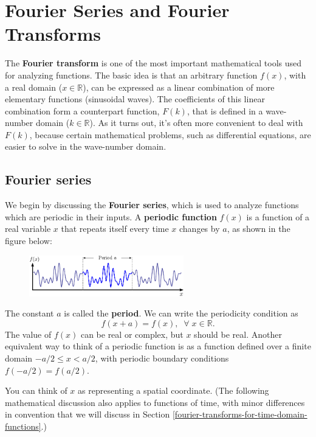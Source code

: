 \documentclass[10pt,a4paper]{article}
\begin{document}
\setcounter{page}{73}

\section{Fourier Series and Fourier Transforms}
\label{fourier-series-and-fourier-transforms}

The \textbf{Fourier transform} is one of the most important mathematical
tools used for analyzing functions. The basic idea is that an arbitrary
function $f(x)$, with a real domain ($x \in \mathbb{R}$), can be
expressed as a linear combination of more elementary functions
(sinusoidal waves). The coefficients of this linear combination form a
counterpart function, $F(k)$, that is defined in a wave-number domain
($k \in \mathbb{R}$). As it turns out, it's often more convenient to
deal with $F(k)$, because certain mathematical problems, such as
differential equations, are easier to solve in the wave-number domain.

\subsection{Fourier series}\label{fourier-series}

We begin by discussing the \textbf{Fourier series}, which is used to
analyze functions which are periodic in their inputs. A \textbf{periodic
function} $f(x)$ is a function of a real variable $x$ that repeats
itself every time $x$ changes by $a$, as shown in the figure below:

\begin{figure}[h]
  \centering\includegraphics[width=0.6\textwidth]{periodicity}
\end{figure}

The constant $a$ is called the \textbf{period}. We can write the
periodicity condition as
\begin{equation}
f(x+a) = f(x), \;\; \forall\; x\in \mathbb{R}.
\end{equation}
The value of $f(x)$ can be real or complex, but $x$ should be real.
Another equivalent way to think of a periodic function is as a function
defined over a finite domain $-a/2 \le x < a/2$, with periodic
boundary conditions $f(-a/2) = f(a/2)$.

You can think of $x$ as representing a spatial coordinate. (The
following mathematical discussion also applies to functions of time,
with minor differences in convention that we will discuss in Section
\ref{fourier-transforms-for-time-domain-functions}.)
\end{document}
